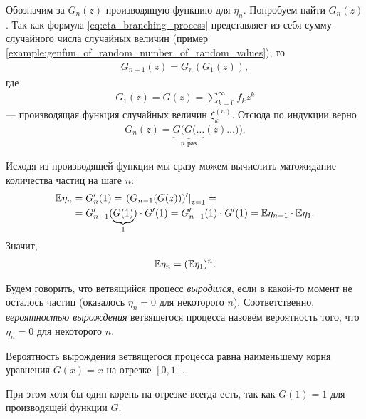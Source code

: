 \documentclass[../main.tex]{subfiles}
\begin{document}
Обозначим за $ G_n(z) $ производящую функцию для $ \eta_n $. Попробуем найти $ G_n(z)$. Так как формула \eqref{eq:eta_branching_process} представляет из себя сумму случайного числа случайных величин (пример \ref{example:genfun_of_random_number_of_random_values}), то
\begin{align*}
 G_{n+1}(z) = G_n(G_1(z)),
\end{align*} где \begin{align*}
 G_1(z) = G(z) = \sum_{k=0}^{\infty}f_kz^{k}
\end{align*} --- производящая функция случайных величин $ \xi^{(n)}_k $. Отсюда по индукции верно
\begin{align*}
 G_n(z) = \underbrace{G(G(\ldots}_{n\text{ раз}}(z)\ldots)).
\end{align*}

Исходя из производящей функции мы сразу можем вычислить матожидание количества частиц на шаге $ n $:
\begin{align*}
 \mathbb E \eta_n &= G_n'(1) = \left.(G_{n-1}(G(z)))'\right|_{z=1} = \\
  &= G_{n-1}'(\underbrace{G(1)}_{1}) \cdot G'(1) = G_{n-1}'(1) \cdot G'(1) = \mathbb E\eta_{n-1} \cdot \mathbb E\eta_1.
\end{align*} Значит,
\begin{align*}
 \mathbb E\eta_n = (\mathbb E\eta_1)^{n}.
\end{align*}

\begin{df*}
 Будем говорить, что ветвящийся процесс \textit{выродился}, если в какой-то момент не осталось частиц (оказалось $ \eta_n = 0 $ для некоторого $ n $). Соответственно, \textit{вероятностью вырождения} ветвящегося процесса назовём вероятность того, что $ \eta_n = 0 $ для некоторого $ n $.
\end{df*}

\begin{thm}
 \label{theorem:stop_branching_process}
 Вероятность вырождения ветвящегося процесса равна наименьшему корня уравнения $ G(x) = x $ на отрезке $ [0,1] $.
\end{thm}

При этом хотя бы один корень на отрезке всегда есть, так как $ G(1) = 1 $ для производящей функции $ G $.
\end{document}
